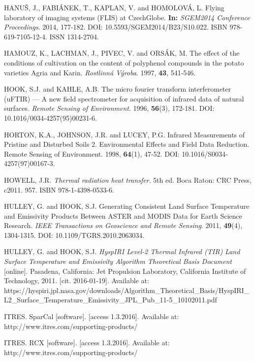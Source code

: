 \begin{thebibliography}{10}
 HANUŠ, J., FABIÁNEK, T., KAPLAN, V. and HOMOLOVÁ, L. Flying laboratory of imaging systems (FLIS) at CzechGlobe. \textbf{In:} \textit{SGEM2014 Conference Proceedings}. 2014, 177-182. DOI: 10.5593/SGEM2014/B23/S10.022. ISBN 978-619-7105-12-4. ISSN 1314-2704.

 HAMOUZ, K., LACHMAN, J., PIVEC, V. and ORSÁK, M. The effect of the conditions of cultivation on the content of polyphenol compounds in the potato varieties Agria and Karin. \textit{Rostlinná Výroba}. 1997, \textbf{43}, 541-546.

 HOOK, S.J. and KAHLE, A.B. The micro fourier transform interferometer (uFTIR) — A new field spectrometer for acquisition of infrared data of natural surfaces. \textit{Remote Sensing of Environment}. 1996, \textbf{56}(3), 172-181. DOI: 10.1016/0034-4257(95)00231-6.

 HORTON, K.A., JOHNSON, J.R. and LUCEY, P.G. Infrared Measurements of Pristine and Disturbed Soils 2. Environmental Effects and Field Data Reduction. Remote Sensing of Environment. 1998, \textbf{64}(1), 47-52. DOI: 10.1016/S0034-4257(97)00167-3.

 HOWELL, J.R. \textit{Thermal radiation heat transfer}. 5th ed. Boca Raton: CRC Press, c2011. 957. ISBN 978-1-4398-0533-6.

 HULLEY, G. and HOOK, S.J. Generating Consistent Land Surface Temperature and Emissivity Products Between ASTER and MODIS Data for Earth Science Research. \textit{IEEE Transactions on Geoscience and Remote Sensing}. 2011, \textbf{49}(4), 1304-1315. DOI: 10.1109/TGRS.2010.2063034.

  HULLEY, G. and HOOK, S.J. \textit{HyspIRI Level-2 Thermal Infrared (TIR) Land Surface Temperature and Emissivity Algorithm Theoretical Basis Document} [online]. Pasadena, California: Jet Propulsion Laboratory, California Institute of Technology, 2011. [cit. 2016-01-19]. Available at: https://hyspiri.jpl.nasa.gov/downloads/Algorithm\_Theoretical\_Basis/HyspIRI\_L2\linebreak\_Surface\_Temperature\_Emissivity\_JPL\_Pub\_11-5\_10102011.pdf

 ITRES. SparCal [software]. [access  1.3.2016]. Available at: http://www.itres.com\linebreak/supporting-products/

 ITRES. RCX [software]. [access 1.3.2016]. Available at: http://www.itres.com\linebreak/supporting-products/


\end{thebibliography}
